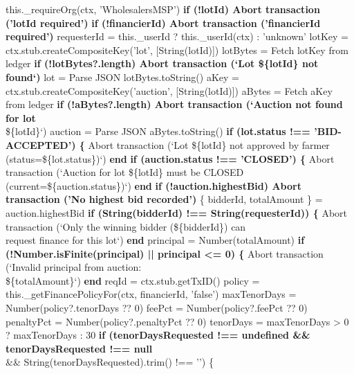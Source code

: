 \documentclass[12pt]{article}
\begin{document}
\begin{algorithm}[H]
\caption{createFinanceRequestForLot() (Part 1 of 3)}
this.\_requireOrg(ctx, 'WholesalersMSP')\;
\textbf{if (!lotId) Abort transaction ('lotId required')}\;
\textbf{if (!financierId) Abort transaction ('financierId required')}\;
requesterId = this.\_userId ? this.\_userId(ctx) : 'unknown'\;
lotKey = ctx.stub.createCompositeKey('lot', [String(lotId)])\;
lotBytes = Fetch lotKey from ledger\;
\textbf{if (!lotBytes?.length) Abort transaction (`Lot \$\{lotId\} not found`)}\;
lot = Parse JSON lotBytes.toString()\;
aKey = ctx.stub.createCompositeKey('auction', [String(lotId)])\;
aBytes = Fetch aKey from ledger\;
\textbf{if (!aBytes?.length) Abort transaction (`Auction not found for lot}\\
\quad \$\{lotId\}`)\;
auction = Parse JSON aBytes.toString()\;
\textbf{if (lot.status !== 'BID-ACCEPTED') \{}\;
Abort transaction (`Lot \$\{lotId\} not approved by farmer\\
\quad (status=\$\{lot.status\})`)\;
\textbf{end}\;
\textbf{if (auction.status !== 'CLOSED') \{}\;
Abort transaction (`Auction for lot \$\{lotId\} must be CLOSED\\
\quad (current=\$\{auction.status\})`)\;
\textbf{end}\;
\textbf{if (!auction.highestBid) Abort transaction ('No highest bid recorded')}\;
\{ bidderId, totalAmount \} = auction.highestBid\;
\textbf{if (String(bidderId) !== String(requesterId)) \{}\;
Abort transaction (`Only the winning bidder (\$\{bidderId\}) can\\
\quad request finance for this lot`)\;
\textbf{end}\;
principal = Number(totalAmount)\;
\textbf{if (!Number.isFinite(principal) || principal <= 0) \{}\;
Abort transaction (`Invalid principal from auction:\\
\quad \$\{totalAmount\}`)\;
\textbf{end}\;
reqId = ctx.stub.getTxID()\;
policy = this.\_getFinancePolicyFor(ctx, financierId, 'false')\;
maxTenorDays = Number(policy?.tenorDays ?? 0)\;
feePct = Number(policy?.feePct ?? 0)\;
penaltyPct = Number(policy?.penaltyPct ?? 0)\;
tenorDays = maxTenorDays > 0 ? maxTenorDays : 30\;
\textbf{if (tenorDaysRequested !== undefined \&\& tenorDaysRequested !== null}\\
\quad \&\& String(tenorDaysRequested).trim() !== '') \{\;
\end{algorithm}
\end{document}
